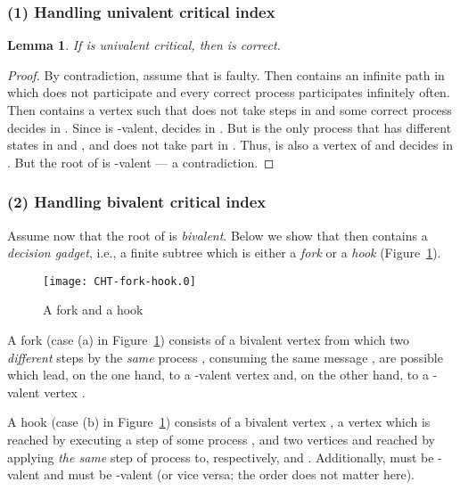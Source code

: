 \documentclass[11pt]{article}
\newtheorem{lemma}{Lemma}
\begin{document}
\subsubsection*{(1) Handling univalent critical index}
\label{subsec:cht:univalent}


\begin{lemma}
\label{lemma:cht-univalent}
If  is univalent critical, then  is correct.
\end{lemma}
\begin{proof}
By contradiction, assume that  is faulty.
Then  contains an infinite path  in which  does not participate
	and every correct process participates infinitely often.
Then  contains a vertex  such that  does not take steps in  and some correct process  decides in .
Since  is -valent,  decides  in .
But  is the only process that has different states in
	 and , and  does not take part in .
Thus,  is also a vertex of 
	and  decides  in .
But the root of  is -valent
	--- a contradiction.
\end{proof}


\subsubsection*{(2) Handling bivalent critical index}
\label{subsec:cht:bivalent}


Assume now that the root of  is \emph{bivalent}.
Below we show that  then contains a \emph{decision gadget}, i.e.,
	a finite subtree which is either a \emph{fork} or a \emph{hook}
	(Figure~\ref{fig:CHT-fork-hook}).

\begin{figure}[htbp]
  \centering
  \texttt{[image: CHT-fork-hook.0]}
  \caption{A fork and a hook}
  \label{fig:CHT-fork-hook}
\end{figure}


A fork (case (a) in Figure~\ref{fig:CHT-fork-hook}) consists of a bivalent
	vertex  from which two \emph{different} steps by the
	\emph{same} process , consuming the same message ,
	are possible which lead, on the one hand, to
	a -valent vertex  and, on the other hand, to a -valent vertex
	.

A hook (case (b) in Figure~\ref{fig:CHT-fork-hook}) consists of a
	bivalent vertex , a vertex  which is reached by
	executing a step of some process , and two vertices
	 and  reached by applying \emph{the same} step of process 
	to, respectively,  and .
Additionally,  must be -valent and  must be -valent (or vice
	versa; the order does not matter here).
\end{document}
